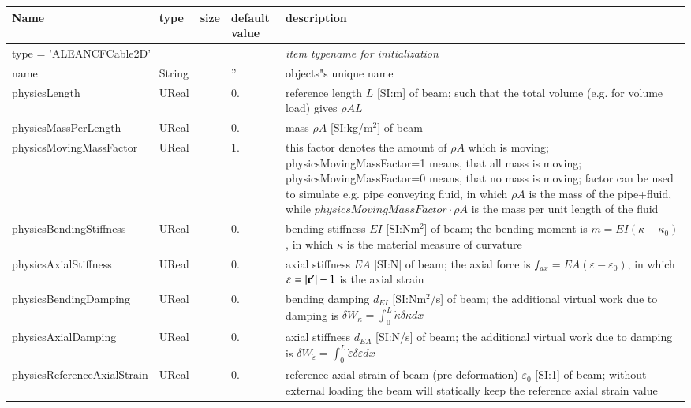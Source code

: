 \begin{center}
  \footnotesize
  \begin{longtable}{| p{4.5cm} | p{2.5cm} | p{0.5cm} | p{2.5cm} | p{6cm} |}
    \hline
    \bf Name & \bf type & \bf size & \bf default value & \bf description \\ \hline
    \multicolumn{4}{l}{\parbox{10cm}{type = 'ALEANCFCable2D'}} & \multicolumn{1}{l}{\parbox{6cm}{\it item typename for initialization}}\\ \hline
    name &     String &      &     '' &     objects"s unique name\\ \hline
    physicsLength &     UReal &      &     0. &     reference length $L$ [SI:m] of beam; such that the total volume (e.g. for volume load) gives $\rho A L$\\ \hline
    physicsMassPerLength &     UReal &      &     0. &     mass $\rho A$ [SI:kg/m$^2$] of beam\\ \hline
    physicsMovingMassFactor &     UReal &      &     1. &     this factor denotes the amount of $\rho A$ which is moving; physicsMovingMassFactor=1 means, that all mass is moving; physicsMovingMassFactor=0 means, that no mass is moving; factor can be used to simulate e.g. pipe conveying fluid, in which $\rho A$ is the mass of the pipe+fluid, while $physicsMovingMassFactor \cdot \rho A$ is the mass per unit length of the fluid\\ \hline
    physicsBendingStiffness &     UReal &      &     0. &     bending stiffness $EI$ [SI:Nm$^2$] of beam; the bending moment is $m = EI (\kappa - \kappa_0)$, in which $\kappa$ is the material measure of curvature\\ \hline
    physicsAxialStiffness &     UReal &      &     0. &     axial stiffness $EA$ [SI:N] of beam; the axial force is $f_{ax} = EA (\varepsilon -\varepsilon_0)$, in which $\varepsilon = |\mathbf{r}^\prime|-1$ is the axial strain\\ \hline
    physicsBendingDamping &     UReal &      &     0. &     bending damping $d_{EI}$ [SI:Nm$^2$/s] of beam; the additional virtual work due to damping is $\delta W_{\dot \kappa} = \int_0^L \dot \kappa \delta \kappa dx$\\ \hline
    physicsAxialDamping &     UReal &      &     0. &     axial stiffness $d_{EA}$ [SI:N/s] of beam; the additional virtual work due to damping is $\delta W_{\dot\varepsilon} = \int_0^L \dot \varepsilon \delta \varepsilon dx$\\ \hline
    physicsReferenceAxialStrain &     UReal &      &     0. &     reference axial strain of beam (pre-deformation) $\varepsilon_0$ [SI:1] of beam; without external loading the beam will statically keep the reference axial strain value\\ \hline

\end{longtable}
\end{center}
